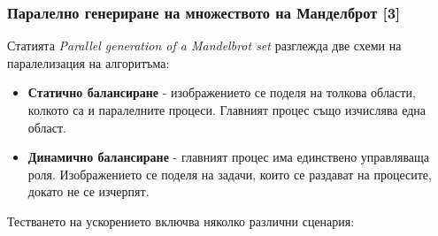 \documentclass[a4paper,11pt]{article}
\begin{document}
\subsubsection{Паралелно генериране на множеството на Манделброт [3]}
Статията \emph{Parallel generation of a Mandelbrot set} разглежда две схеми на паралелизация на алгоритъма:
\begin{itemize}
    \item \textbf{Статично балансиране} - изображението се поделя на толкова области, колкото са и паралелните процеси. Главният процес също изчислява една област. 
    \item \textbf{Динамично балансиране} - главният процес има единствено управляваща роля. Изображението се поделя на задачи, които се раздават на процесите, докато не се изчерпят.
\end{itemize}
Тестването на ускорението включва няколко различни сценария:
\end{document}
